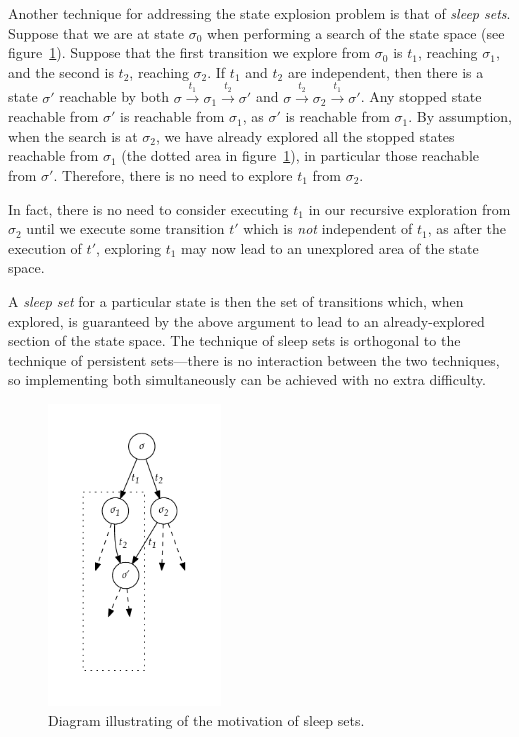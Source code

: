 \documentclass[12pt,a4paper,twoside,openright]{report}
\begin{document}
Another technique for addressing the state explosion
problem is that of \emph{sleep sets}. Suppose that
we are at state $\sigma_0$ when performing a search
of the state space (see figure~\ref{fig:sleep}).
Suppose that the first transition
we explore from $\sigma_0$ is $t_1$, reaching $\sigma_1$,
and the second is $t_2$, reaching $\sigma_2$.
If $t_1$ and $t_2$ are independent, then there
is a state $\sigma'$ reachable by both
$\sigma \xrightarrow{t_1} \sigma_1
\xrightarrow{t_2} \sigma'$ and
$\sigma \xrightarrow{t_2} \sigma_2
\xrightarrow{t_1} \sigma'$.
Any stopped state reachable from $\sigma'$
is reachable from $\sigma_1$, as $\sigma'$
is reachable from $\sigma_1$. By assumption,
when the search is at $\sigma_2$, we have already
explored all the stopped states reachable from
$\sigma_1$ (the dotted area in figure~\ref{fig:sleep}),
in particular those reachable from
$\sigma'$. Therefore, there is no need to
explore $t_1$ from $\sigma_2$.

In fact, there is no need to consider executing
$t_1$ in our recursive exploration from $\sigma_2$
until we execute some transition $t'$ which is
\emph{not} independent of $t_1$, as after
the execution of $t'$, exploring $t_1$ may
now lead to an unexplored area of the state space.

A \emph{sleep set} for a particular state
is then the set of transitions which, when
explored, is guaranteed by the above
argument to lead to an already-explored
section of the state space\footnotemark.
The technique of
sleep sets is orthogonal to the technique
of persistent sets---there is no interaction
between the two techniques, so implementing
both simultaneously can be achieved with
no extra difficulty.

\begin{figure}
	\centering
	\includegraphics[height=8cm]{sleep}
	\caption{Diagram illustrating of the motivation
		of sleep sets.}
	\label{fig:sleep}
\end{figure}
\end{document}

